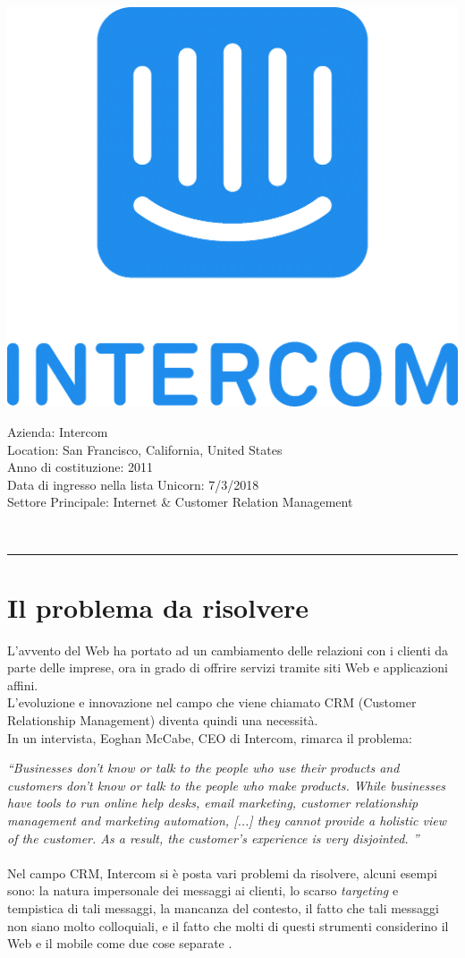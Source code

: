\documentclass[a4paper, 11pt]{article}
\begin{document}
\newpage
\noindent
\begin{minipage}{0.3\textwidth}
\includegraphics[width=0.75 \linewidth]{images/intercomlogo.png}
\end{minipage}
\hfill
\begin{minipage}{0.7\textwidth}\raggedleft
Azienda: Intercom\\
Location: San Francisco, California, United States \\
Anno di costituzione: 2011 \\
Data di ingresso nella lista Unicorn: 7/3/2018 \\
Settore Principale: Internet \& Customer Relation Management
\end{minipage}\\
\par\noindent\rule{\textwidth}{0.4pt}

\section*{Il problema da risolvere}
L'avvento del Web ha portato ad un cambiamento delle relazioni con i clienti da parte delle imprese, ora in grado di offrire servizi tramite siti Web e applicazioni affini.\\
L'evoluzione e innovazione nel campo che viene chiamato CRM (Customer Relationship Management) diventa quindi una necessità. \\
In un intervista, Eoghan McCabe, CEO di Intercom, rimarca il problema:\\ \par
\textit{“Businesses don't know or talk to the people who use their products and customers don’t know or talk to the people who make products.  While businesses have tools to run online help desks, email marketing, customer relationship management and marketing automation, [...] they cannot provide a holistic view of the customer. As a result, the customer’s experience is very disjointed. \cite{Pamela}”}
\\
\\
Nel campo CRM, Intercom si è posta vari problemi da risolvere, alcuni esempi sono: la natura impersonale dei messaggi ai clienti, lo scarso \textit{targeting} e tempistica di tali messaggi, la mancanza del contesto, il fatto che tali messaggi non siano molto colloquiali, e il fatto che molti di questi strumenti considerino il Web e il mobile come due cose separate \cite{tc1}.
\end{document}
